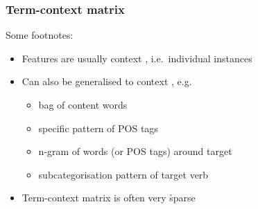 \documentclass[t]{beamer} %
\begin{document}
\begin{frame}
  \frametitle{Term-context matrix}

  Some footnotes:
  \begin{itemize}
  \item Features are usually context , i.e.\ individual instances
  \item Can also be generalised to context , e.g.
    \begin{itemize}
    \item bag of content words
    \item specific pattern of POS tags 
    \item n-gram of words (or POS tags) around target
    \item subcategorisation pattern of target verb
    \end{itemize}
  \item Term-context matrix is often very \h{sparse}
  \end{itemize}

\end{frame}
\end{document}

